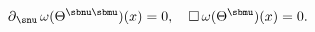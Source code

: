 \begin{equation} \label{6.4}
\partial{}_{\snu} \, \omega(\Theta^{\sbnu \sbmu})(x) 
= 0, \quad
\square  \, \omega(\Theta^{\sbmu})(x)  = 0. 
\end{equation}

